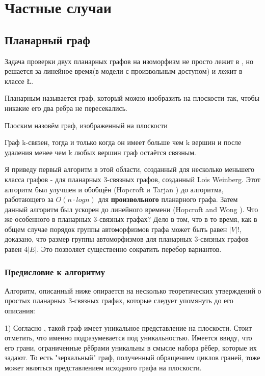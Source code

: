 \section{Частные случаи}
\subsection{Планарный граф}
Задача проверки двух планарных графов на изоморфизм не просто лежит в \poly, но решается за линейное время(в модели с произвольным доступом) \cite{1} и лежит в классе \L\cite{2}.
\begin{definition}
    Планарным называется граф, который можно изобразить на плоскости так, чтобы никакие его два ребра не пересекались.
\end{definition}
\begin{definition}
    Плоским назовём граф, изображенный на плоскости
\end{definition}
\begin{definition}
    Граф k-связен, тогда и только когда он имеет больше чем k вершин и после удаления менее чем k любых вершин граф остаётся связным. 
\end{definition}
Я приведу первый алгоритм в этой области, созданный для несколько меньшего класса графов - для планарных 3-связных графов\cite{3}, созданный Lois Weinberg. Этот алгоритм был улучшен и обобщён (Hopcroft и Tarjan \cite{6}) до алгоритма, работающего за $O(n \cdot logn)$ для \textbf{произвольного} планарного графа. Затем данный алгоритм был ускорен до линейного времени (Hopcroft and Wong \cite{1}).
Что же особенного в планарных 3-связных графах? Дело в том, что в то время, как в общем случае порядок группы автоморфизмов графа может быть равен $|V|!$, доказано\cite{4}, что размер группы автоморфизмов для планарных 3-связных графов равен $4|E|$. Это позволяет существенно сократить перебор вариантов.
\subsubsection*{Предисловие к алгоритму}
Алгоритм, описанный ниже опирается на несколько теоретических утверждений о простых планарных 3-связных графах, которые следует упомянуть до его описания:

1) Согласно \cite{5}, такой граф имеет уникальное представление на плоскости. Стоит отметить, что именно подразумевается под уникальностью. Имеется ввиду, что его грани, ограниченные рёбрами уникальны в смысле набора рёбер, которые их задают. То есть "зеркальный" граф, полученный обращением циклов граней, тоже может являться представлением исходного графа на плоскости.

